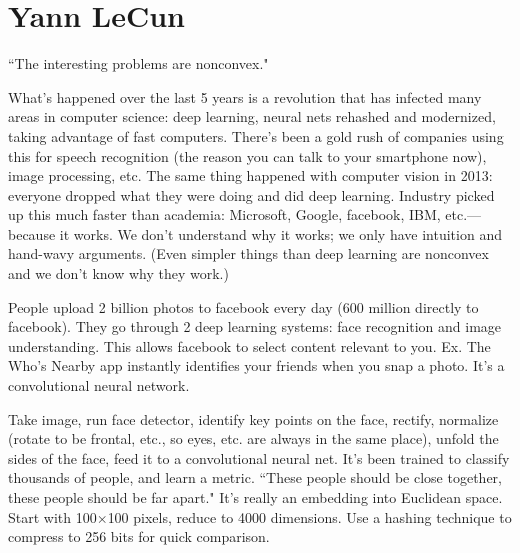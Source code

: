 \def\filepath{C:/Users/Owner/Dropbox/Math/templates}






\pagestyle{fancy}
\chead{} 
\lfoot{} 
\cfoot{\thepage} 
\rfoot{} 
\renewcommand{\headrulewidth}{.3pt} 
\setlength\voffset{0in}
\setlength\textheight{648pt}




\section{Yann LeCun}

``The interesting problems are nonconvex."

What's happened over the last 5 years is a revolution that has infected many areas in computer science: deep learning, neural nets rehashed and modernized, taking advantage of fast computers. There's been a gold rush of companies using this for speech recognition (the reason you can talk to your smartphone now), image processing, etc. The same thing happened with computer vision in 2013: everyone dropped what they were doing and did deep learning. %
Industry picked up this much faster than academia: Microsoft, Google, facebook, IBM, etc.---because it works. %
We don't understand why it works; we only have intuition and hand-wavy arguments.
(Even simpler things than deep learning are nonconvex and we don't know why they work.)

People upload 2 billion photos to facebook every day (600 million directly to facebook). They go through 2 deep learning systems: face recognition and image understanding. This allows facebook to select content relevant to you.
Ex. The Who's Nearby app instantly identifies your friends when you snap a photo. It's a convolutional neural network. %

Take image, run face detector, identify key points on the face, rectify,  normalize (rotate to be frontal, etc., so eyes, etc. are always in the same place), unfold the sides of the face, feed it to a convolutional neural net. It's been trained to classify thousands of people, and learn a metric. ``These people should be close together, these people should be far apart." It's really an embedding into Euclidean space. Start with 100$\times$100 pixels, reduce to 4000 dimensions. Use a hashing technique to compress to 256 bits for quick comparison.

